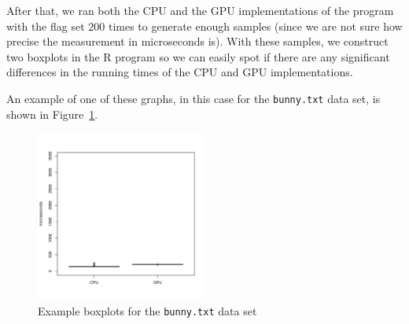 After that, we ran both the CPU and the GPU implementations of the program with the flag set $200$ times to generate enough samples (since we are not sure how precise the measurement in microseconds is).
With these samples, we construct two boxplots in the R program so we can easily spot if there are any significant differences in the running times of the CPU and GPU implementations.

An example of one of these graphs, in this case for the \texttt{bunny.txt} data set, is shown in Figure~\ref{fig:bunny_box}.

\begin{figure}
	\center
	\includegraphics[width=0.5\textwidth]{results/time/bunny.pdf}
	\caption{Example boxplots for the \texttt{bunny.txt} data set}
	\label{fig:bunny_box}
\end{figure}

